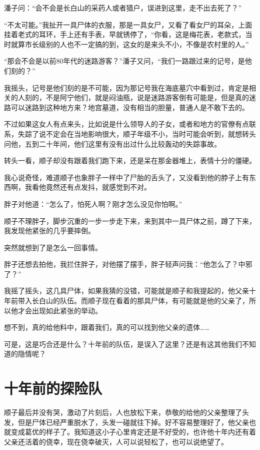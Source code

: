 潘子问：“会不会是长白山的采药人或者猎户，误进到这里，走不出去死了？”

“不太可能。”我扯开一具尸体的衣服，那是一具女尸，又看了看女尸的耳朵，上面挂着老式的耳环，手上还有手表，早就锈停了，“你看，这是梅花表，老款式，当时就算市长级别的人也不一定搞的到，这女的是来头不小，不像是农村里的人。”

“那会不会是以前80年代的迷路游客？”潘子又问，“我们一路跟过来的记号，是他们刻的？”

我摇头，记号是他们刻的是不可能，因为那记号我在海底墓穴中看到过，肯定是相关的人刻的，不是阿宁他们，就是闷油瓶，说是迷路游客倒有可能是，但是真的迷路可以迷路到这种地方来？地宫墓道，没有相当的胆量，普通人是不敢下去的。

不过如果这女人有点来头，比如说是什么领导人的子女，或者和地方的官僚有点联系，失踪了说不定会在当地影响很大，顺子年级不小，当时可能会听到，就想转头问他，五到二十年间，他们这里有没有出过什么比较轰动的失踪事故。

转头一看，顺子却没有跟着我们跑下来，还是呆在那金器堆上，表情十分的僵硬。

我心说奇怪，难道顺子也象胖子一样中了尸胎的舌头了，又没看到他的脖子上有东西啊，我看他竟然还有点发抖，就感觉到不对。

胖子对他道：“怎么了，怕死人啊？刚才怎么没见你怕啊。”

顺子不理胖子，脚步沉重的一步一步走下来，来到其中一具尸体之前，蹲了下来，我发现他紧张的几乎要摔倒。

突然就想到了是怎么一回事情。

胖子还想去拍他，我拦住胖子，对他摆了摆手，胖子轻声问我：“他怎么了？中邪了？”

我摇了摇头，这几具尸体，如果我猜的没错，可能就是顺子和我提起的，他父亲十年前带入长白山的队伍。而顺子现在看着的那具尸体，有可能就是他的父亲了，所以他才会出现如此紧张的举动。

想不到，真的给他料中，跟着我们，真的可以找到他父亲的遗体……

可是，这是巧合还是什么？十年前的队伍，是误入了这里？还是有这其他我们不知道的隐情呢？

\chapter{十年前的探险队}

顺子最后并没有哭，激动了片刻后，人也放松下来，恭敬的给他的父亲整理了头发，但是尸体已经严重脱水了，头发一碰就往下掉。好不容易整理好了，他父亲也就变成葛优的样子了。我知道这小子心里肯定还是不好受的，也许他十年内还有着父亲还活着的侥幸，现在侥幸破灭，人可以说轻松了，也可以说绝望了。

